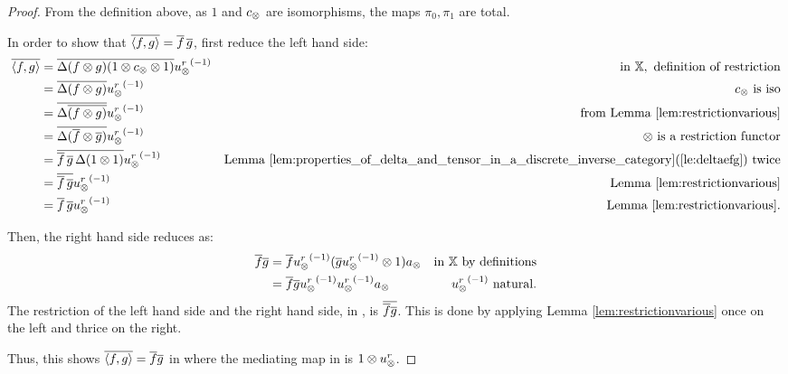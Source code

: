 \begin{proof}
  From the definition above, as $1$ and $c_{\otimes}$ are isomorphisms, the maps $\pi_0, \pi_1$ are
  total.

  In order to show that $\overline{\langle f,g\rangle} = \overline{f}\,\overline{g}$, first reduce the left hand side:
  \begin{align*}
    \overline{\langle f,g\rangle}
      &=\overline{\Delta(f\otimes g)(1\otimes c_{\otimes}\otimes1)}{u_{\otimes}^r}^{(-1)}&\text{in }\mathbb{X}, \text{ definition of restriction}\\
    &=\overline{\Delta(f\otimes g)}{u_{\otimes}^r}^{(-1)} &c_{\otimes}\text{ is iso}\\
    &=\overline{\Delta\overline{(f\otimes g)}}{u_{\otimes}^r}^{(-1)} &\text{from Lemma \ref{lem:restrictionvarious}}\\
    &=\overline{\Delta(\overline{f}\otimes\overline{g})}{u_{\otimes}^r}^{(-1)} &\otimes\text{ is a restriction functor}\\
    &=\overline{\overline{f}\,\overline{g}\,\Delta(1\otimes1)}{u_{\otimes}^r}^{(-1)} &\text{Lemma  \ref{lem:properties_of_delta_and_tensor_in_a_discrete_inverse_category}(\ref{le:deltaefg}) twice}\\
    &=\overline{\overline{f}\,\overline{g}}{u_{\otimes}^r}^{(-1)} &\text{Lemma  \ref{lem:restrictionvarious}}\\
    &=\overline{f}\,\overline{g}{u_{\otimes}^r}^{(-1)}  &\text{Lemma  \ref{lem:restrictionvarious}.}\\
  \end{align*}

  Then, the right hand side reduces as:
  \begin{align*}
    \rst{f} \rst{g}
    &= \rst{f}\inv{\usr}(\rst{g}\inv{\usr} \* 1) a_{\*} & \text{in \X by definitions}\\
    &= \rst{f} \rst{g}\inv{\usr}\inv{\usr} a_{\*} &  \inv{\usr}\text{ natural.}
  \end{align*}
  The restriction of the left hand side and the right hand side, in \X, is $\overline{\overline{f} \overline{g}}$.
  This is done by applying Lemma \vref{lem:restrictionvarious} once on the left and
  thrice on the right.

  Thus, this shows $\overline{\langle f,g\rangle}=\overline{f} \overline{g}$ in \Xt where the mediating map in \X is
  $1\otimes u_{\otimes}^r$.


\end{proof}
